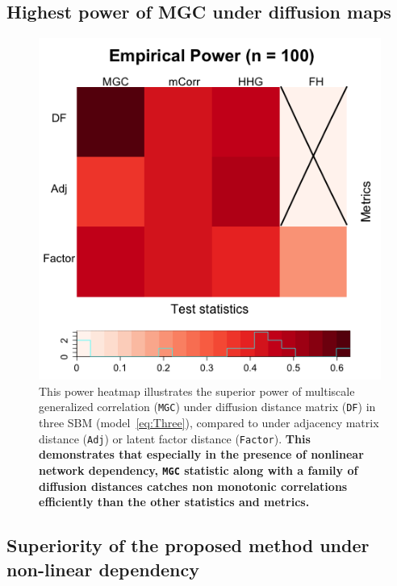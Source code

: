 \documentclass[12pt]{article}
\begin{document}
\subsection*{Highest power of MGC under diffusion maps}

\begin{figure}
	\centering
	\includegraphics[width=0.38\paperwidth, height=0.33\paperwidth]{../Figure/ThreeSBM_results_simple.png}
	\caption{This power heatmap illustrates the superior power of multiscale generalized correlation (\texttt{MGC}) under diffusion distance matrix (\texttt{DF}) in three SBM (model~\ref{eq:Three}), compared to under adjacency matrix distance (\texttt{Adj}) or latent factor distance (\texttt{Factor}). \textbf{This demonstrates that especially in the presence of nonlinear network dependency, \texttt{MGC} statistic along with a family of diffusion distances catches non monotonic correlations efficiently than the other statistics and metrics.}}
	\label{fig:threeSBM}
\end{figure}


\subsection*{Superiority of the proposed method under non-linear dependency}
\end{document}
